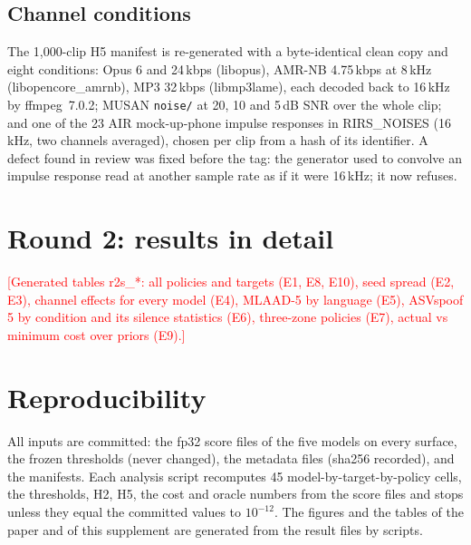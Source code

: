 \documentclass[10pt]{article}
\newcommand{\todo}[1]{\textcolor{red}{[#1]}}
\begin{document}
\subsection{Channel conditions}
The 1,000-clip H5 manifest is re-generated with a byte-identical clean copy and eight conditions: Opus 6 and 24\,kbps
(libopus), AMR-NB 4.75\,kbps at 8\,kHz (libopencore\_amrnb), MP3 32\,kbps (libmp3lame), each decoded back to 16\,kHz by
ffmpeg~7.0.2; MUSAN \texttt{noise/} \cite{snyder15_musan} at 20, 10 and 5\,dB SNR over the whole clip; and one of the 23 AIR
mock-up-phone impulse responses \cite{jeub09_air} in RIRS\_NOISES \cite{ko17_rirs} (16\,kHz, two channels averaged), chosen per
clip from a hash of its identifier. A defect found in review was fixed before the tag: the generator used to convolve an
impulse response read at another sample rate as if it were 16\,kHz; it now refuses.

\section{Round 2: results in detail}
\label{sec:r2results}
\todo{Generated tables r2s\_*: all policies and targets (E1, E8, E10), seed spread (E2, E3), channel effects for every model
(E4), MLAAD-5 by language (E5), ASVspoof 5 by condition and its silence statistics (E6), three-zone policies (E7), actual vs
minimum cost over priors (E9).}

\section{Reproducibility}
All inputs are committed: the fp32 score files of the five models on every surface, the frozen thresholds (never changed), the metadata files
(sha256 recorded), and the manifests. Each analysis script recomputes 45 model-by-target-by-policy cells, the thresholds, H2, H5, the cost and
oracle numbers from the score files and stops unless they equal the committed values to \(10^{-12}\). The figures and the tables of the
paper and of this supplement are generated from the result files by scripts.



\end{document}
